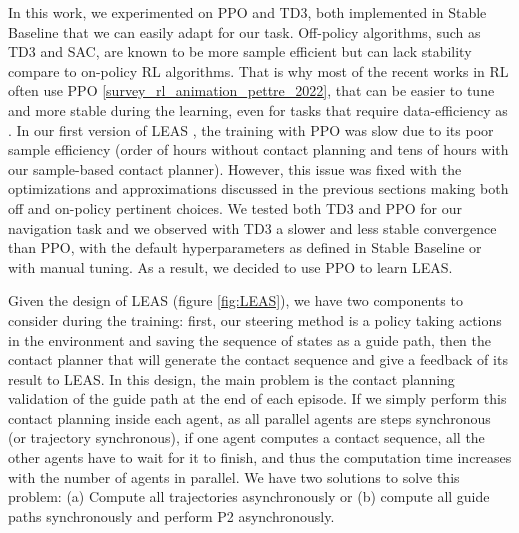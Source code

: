 In this work, we experimented on PPO and TD3, both implemented in Stable Baseline \cite{stable-baselines} that we can easily adapt for our task.
Off-policy algorithms, such as TD3 and SAC, are known to be more sample efficient but can lack stability compare to on-policy RL algorithms.
That is why most of the recent works in RL often use PPO \ref{survey_rl_animation_pettre_2022}, that can be easier to tune and more stable during the learning, even for tasks that require data-efficiency as \cite{openai2019dota}.
In our first version of LEAS \cite{LEAS}, the training with PPO was slow due to its poor sample efficiency (order of hours without contact planning and tens of hours with our sample-based contact planner). %
However, this issue was fixed with the optimizations and approximations discussed in the previous sections making both off and on-policy pertinent choices.
We tested both TD3 and PPO for our navigation task and we observed with TD3 a slower and less stable convergence than PPO, with the default hyperparameters as defined in Stable Baseline or with manual tuning.
As a result, we decided to use PPO to learn LEAS.

Given the design of LEAS (figure \ref{fig:LEAS}), we have two components to consider during the training: first, our steering method is a policy taking actions in the environment and saving the sequence of states as a guide path, then the contact planner that will generate the contact sequence and give a feedback of its result to LEAS. 
In this design, the main problem is the contact planning validation of the guide path at the end of each episode. 
If we simply perform this contact planning inside each agent, as all parallel agents are steps synchronous (or trajectory synchronous), if one agent computes a contact sequence, all the other agents have to wait for it to finish, and thus the computation time increases with the number of agents in parallel.
We have two solutions to solve this problem: (a) Compute all trajectories asynchronously or (b) compute all guide paths synchronously and perform P2 asynchronously.

